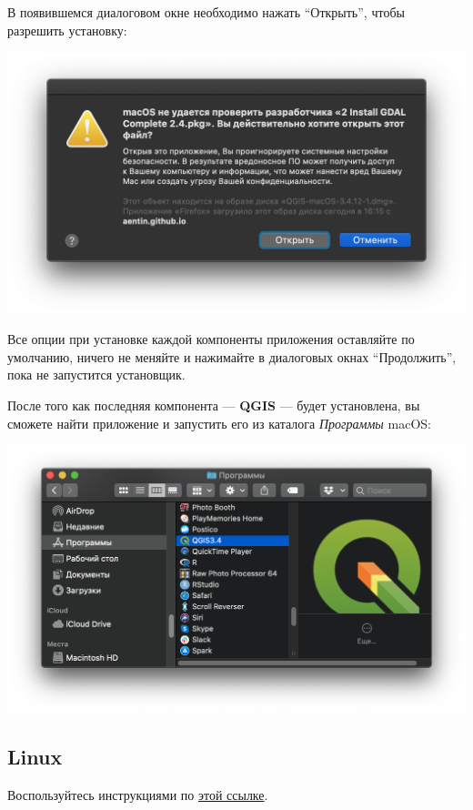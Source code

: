 \documentclass[
  12pt,
]{book}
\begin{document}
В появившемся диалоговом окне необходимо нажать ``Открыть'', чтобы разрешить установку:

\includegraphics{images/installation_instruction_mac/mac04.png}

Все опции при установке каждой компоненты приложения оставляйте по умолчанию, ничего не меняйте и нажимайте в диалоговых окнах ``Продолжить'', пока не запустится установщик.

После того как последняя компонента --- \textbf{QGIS} --- будет установлена, вы сможете найти приложение и запустить его из каталога \emph{Программы} macOS:

\includegraphics{images/installation_instruction_mac/mac05.png}

\hypertarget{linux}{%
\subsection*{Linux}\label{linux}}

Воспользуйтесь инструкциями по \href{https://qgis.org/ru/site/forusers/alldownloads.html\#linux}{этой ссылке}.
\end{document}

